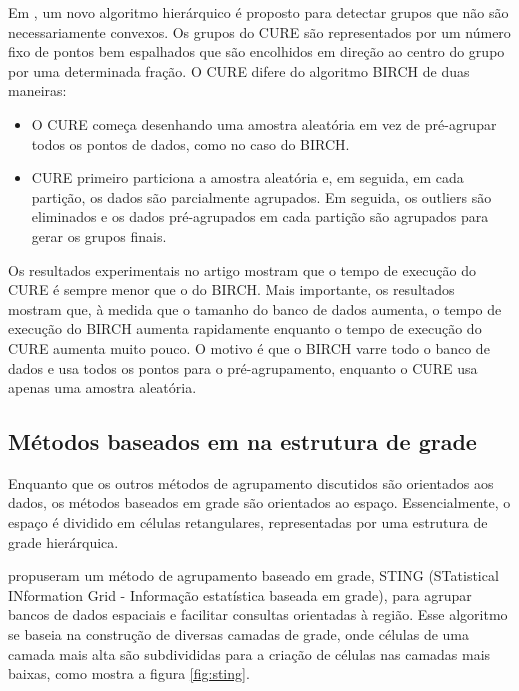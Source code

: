 Em \cite{Guha1998}, um novo algoritmo hierárquico é proposto para detectar grupos que não são necessariamente convexos. Os grupos do CURE são representados por um número fixo de pontos bem espalhados que são encolhidos em direção ao centro do grupo por uma determinada fração. O CURE difere do algoritmo BIRCH de duas maneiras:
\begin{itemize}
\item O CURE começa desenhando uma amostra aleatória em vez de pré-agrupar todos os pontos de dados, como no caso do BIRCH.
\item CURE primeiro particiona a amostra aleatória e, em seguida, em cada partição, os dados são parcialmente agrupados. Em seguida, os outliers são eliminados e os dados pré-agrupados em cada partição são agrupados para gerar os grupos finais.
\end{itemize}
Os resultados experimentais no artigo mostram que o tempo de execução do CURE é sempre menor que o do BIRCH. Mais importante, os resultados mostram que, à medida que o tamanho do banco de dados aumenta, o tempo de execução do BIRCH aumenta rapidamente enquanto o tempo de execução do CURE aumenta muito pouco. O motivo é que o BIRCH varre todo o banco de dados e usa todos os pontos para o pré-agrupamento, enquanto o CURE usa apenas uma amostra aleatória.

\subsection{Métodos baseados em na estrutura de grade}
Enquanto que os outros métodos de agrupamento discutidos são orientados aos dados, os métodos baseados em grade são orientados ao espaço. Essencialmente, o espaço é dividido em células retangulares, representadas por uma estrutura de grade hierárquica.

\cite{Wang1997} propuseram um método de agrupamento baseado em grade, STING (STatistical INformation Grid - Informação estatística baseada em grade), para agrupar bancos de dados espaciais e facilitar consultas orientadas à região. Esse algoritmo se baseia na construção de diversas camadas de grade, onde células de uma camada mais alta são subdivididas para a criação de células nas camadas mais baixas, como mostra a figura \ref{fig:sting}.

\begin{figure}[!h]
	\centering	
\end{figure}


